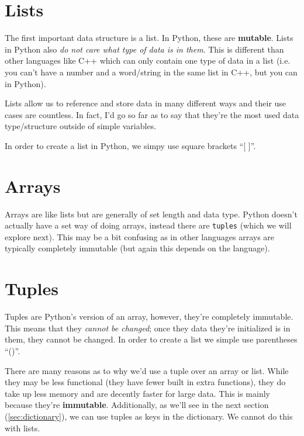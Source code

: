 \documentclass[12pt,a4paper]{book}
\begin{document}
		\section{Lists}
			The first important data structure is a list. In Python, these are \textbf{mutable}. Lists in Python also \textit{do not care what type of data is in them}. This is different than other languages like C++ which can only contain one type of data in a list (i.e. you can't have a number and a word/string in the same list in C++, but you can in Python).
			
			Lists allow us to reference and store data in many different ways and their use cases are countless. In fact, I'd go so far as to say that they're the most used data type/structure outside of simple variables.
			
			In order to create a list in Python, we simpy use square brackets ``[ ]''.
  			 
		\section{Arrays}
			Arrays are like lists but are generally of set length and data type. Python doesn't actually have a set way of doing arrays, instead there are \texttt{tuples} (which we will explore next). This may be a bit confusing as in other languages arrays are typically completely immutable (but again this depends on the language).
		
		\section{Tuples}
			Tuples are Python's version of an array, however, they're completely immutable. This means that they \textit{cannot be changed}; once they data they're initialized is in them, they cannot be changed. In order to create a list we simple use parentheses ``()''. 
			
			
			
			There are many reasons as to why we'd use a tuple over an array or list. While they may be less functional (they have fewer built in extra functions), they do take up less memory and are decently faster for large data. This is mainly because they're \textbf{immutable}. Additionally, as we'll see in the next section (\ref{sec:dictionary}), we can use tuples as keys in the dictionary. We cannot do this with lists.
\end{document}
